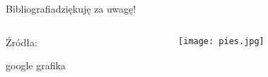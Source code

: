 \documentclass{beamer}
\begin{document}
	\begin{frame}{Bibliografia}{dziękuję za uwagę!}
		\begin{columns}
			\begin{column}{0.5\textwidth}
			Źródła:
			
			\href{https://pl.wikipedia.org/wiki/Pies_domowy}{}	
			\href{https://www.bowlandbone.pl/historie-cenionych-i-znanych-psow-ktore-zachwycily-swiat/}{}
			
			google grafika
			\end{column}
			\begin{column}{0.5\textwidth}
				\texttt{[image: pies.jpg]}	
			\end{column}
		\end{columns}
	\end{frame}
	
\end{document}

